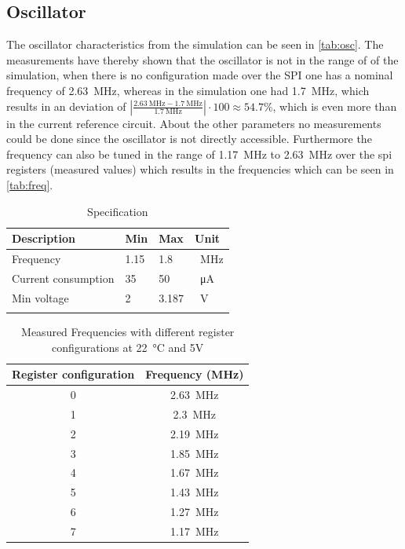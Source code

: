 \subsection{Oscillator}
\label{subsubsec:oscillator}
The oscillator characteristics from the simulation can be seen in \autoref{tab:osc}. The measurements have thereby shown that the oscillator is not in the range of of the simulation, when there is no configuration made over the SPI one has a nominal frequency of \qty{2.63}{\mega\hertz}, whereas in the simulation one had \qty{1.7}{\mega\hertz}, which results in an deviation of $\left|\frac{\qty{2.63}{\mega\hertz}-\qty{1.7}{\mega\hertz}}{\qty{1.7}{\mega\hertz}}\right|\cdot 100\approx 54.7 \%$, which is even more than in the current reference circuit. About the other parameters no measurements could be done since the oscillator is not directly accessible. Furthermore the frequency can also be tuned in the range of \qty{1.17}{\mega\hertz} to \qty{2.63}{\mega\hertz} over the spi registers (measured values) which results in the frequencies which can be seen in \autoref{tab:freq}. 
\begin{longtable}{|p{3.5cm}|p{3.5cm}|p{3.5cm}|p{3.5cm}|}
	\hline
	\rowcolor{lightgray}
	\textbf{Description} &\textbf{Min} &\textbf{Max} & \textbf{Unit} \\ \hline
	
	Frequency & 1.15 & 1.8 &\qty{}{\mega\hertz} \\ \hline
	Current consumption & 35 & 50 & \qty{}{\micro\ampere} \\ \hline
	Min voltage & 2& 3.187 & \qty{}{\volt} \\ \hline
	\caption{Specification} %
	\label{tab:osc}
\end{longtable}
\begin{table}[h]
	\centering
	\begin{tabular}{|c|c|}
		\hline
		\rowcolor{lightgray}
		Register configuration & Frequency (MHz) \\
		\hline
		0 & \qty{2.63}{\mega\hertz} \\
		\hline
		1 & \qty{2.3}{\mega\hertz} \\
		\hline
		2 & \qty{2.19}{\mega\hertz} \\
		\hline
		3 & \qty{1.85}{\mega\hertz} \\
		\hline
		4 & \qty{1.67}{\mega\hertz} \\
		\hline
		5 & \qty{1.43}{\mega\hertz} \\
		\hline
		6 & \qty{1.27}{\mega\hertz} \\
		\hline
		7 & \qty{1.17}{\mega\hertz} \\
		\hline
	\end{tabular}
	\caption{Measured Frequencies with different register configurations at \qty{22}{\degreeCelsius} and 5V}
	\label{tab:freq}
\end{table}


